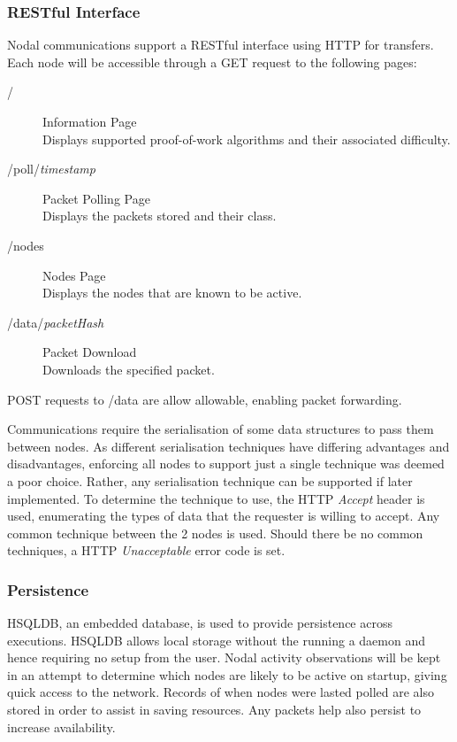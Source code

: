 		\subsubsection*{RESTful Interface}
			Nodal communications support a RESTful interface using HTTP for transfers. Each node will be accessible through a GET request to the following pages:
			\begin{description}
				\item[/] Information Page \\ Displays supported proof-of-work algorithms and their associated difficulty.
				\item[/poll/\textit{timestamp}] Packet Polling Page \\ Displays the packets stored and their class.
				\item[/nodes] Nodes Page \\ Displays the nodes that are known to be active.
				\item[/data/\textit{packetHash}] Packet Download \\ Downloads the specified packet.
			\end{description}
			
			POST requests to /data are allow allowable, enabling packet forwarding.
	
			Communications require the serialisation of some data structures to pass them between nodes. As different serialisation techniques have differing advantages and disadvantages, enforcing all nodes to support just a single technique was deemed a poor choice. Rather, any serialisation technique can be supported if later implemented. To determine the technique to use, the HTTP \textit{Accept} header is used, enumerating the types of data that the requester is willing to accept. Any common technique between the 2 nodes is used. Should there be no common techniques, a HTTP \textit{Unacceptable} error code is set.
			
	
		\subsubsection*{Persistence}
			HSQLDB, an embedded database, is used to provide persistence across executions. HSQLDB allows local storage without the running a daemon and hence requiring no setup from the user. Nodal activity observations will be kept in an attempt to determine which nodes are likely to be active on startup, giving quick access to the network. Records of when nodes were lasted polled are also stored in order to assist in saving resources. Any packets help also persist to increase availability.
			
